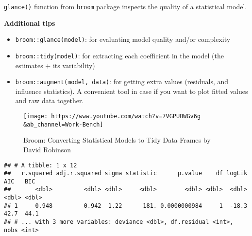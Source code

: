 \documentclass[
]{book}
\newenvironment{Shaded}{\begin{snugshade}}{\end{snugshade}}
\newcommand{\AttributeTok}[1]{\textcolor[rgb]{0.77,0.63,0.00}{#1}}
\newcommand{\CommentTok}[1]{\textcolor[rgb]{0.56,0.35,0.01}{\textit{#1}}}
\newcommand{\DecValTok}[1]{\textcolor[rgb]{0.00,0.00,0.81}{#1}}
\newcommand{\FunctionTok}[1]{\textcolor[rgb]{0.00,0.00,0.00}{#1}}
\newcommand{\NormalTok}[1]{#1}
\newcommand{\OtherTok}[1]{\textcolor[rgb]{0.56,0.35,0.01}{#1}}
\newcommand{\SpecialCharTok}[1]{\textcolor[rgb]{0.00,0.00,0.00}{#1}}
\providecommand{\tightlist}{%
  \setlength{\itemsep}{0pt}\setlength{\parskip}{0pt}}
\begin{document}
\texttt{glance()} function from \texttt{broom} package inspects the quality of a statistical model.

\textbf{Additional tips}

\begin{itemize}
\tightlist
\item
  \texttt{broom::glance(model)}: for evaluating model quality and/or complexity
\item
  \texttt{broom::tidy(model)}: for extracting each coefficient in the model (the estimates + its variability)
\item
  \texttt{broom::augment(model,\ data)}: for getting extra values (residuals, and influence statistics). A convenient tool in case if you want to plot fitted values and raw data together.
\end{itemize}

\begin{figure}
\centering
\texttt{[image: https://www.youtube.com/watch?v=7VGPUBWGv6g\\\&ab\_channel=Work-Bench]}
\caption{Broom: Converting Statistical Models to Tidy Data Frames by David Robinson}
\end{figure}

\begin{Shaded}
\end{Shaded}

\begin{verbatim}
## # A tibble: 1 x 12
##   r.squared adj.r.squared sigma statistic      p.value    df logLik   AIC   BIC
##       <dbl>         <dbl> <dbl>     <dbl>        <dbl> <dbl>  <dbl> <dbl> <dbl>
## 1     0.948         0.942  1.22      181. 0.0000000984     1  -18.3  42.7  44.1
## # ... with 3 more variables: deviance <dbl>, df.residual <int>, nobs <int>
\end{verbatim}

\begin{Shaded}
\end{Shaded}
\end{document}
